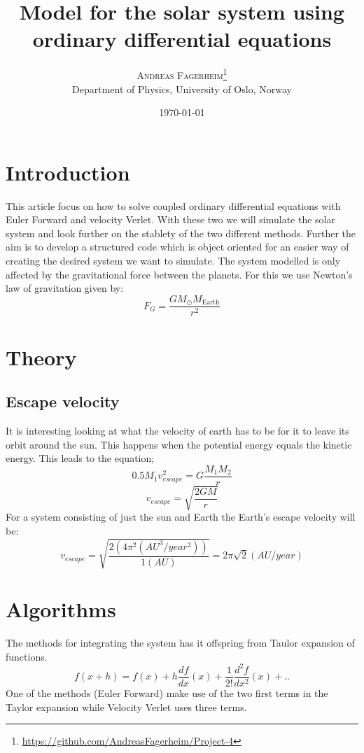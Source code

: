\documentclass[twoside,twocolumn]{article}
\title{Model for the solar system using ordinary differential equations } %
\author{%
\textsc{Andreas Fagerheim}\thanks{\url{https://github.com/AndreasFagerheim/Project-4}} \\[1ex] %
\normalsize Department of Physics, University of Oslo, Norway \\ %
}
\date{\today} %
\begin{document}
\maketitle

\section{Introduction}
This article focus on how to solve coupled ordinary differential equations with Euler Forward and velocity Verlet. With these two we will simulate the solar system and look further on the stablety of the two different methods. Further the aim is to develop a structured code which is object oriented for an easier way of creating the desired system we want to simulate.
The system modelled is only affected by the gravitational force between the planets. For this we use Newton's law of gravitation given by:
\begin{equation}
F_G=\frac{GM_{\odot}M_{\mathrm{Earth}}}{r^2}
\end{equation}
\section{Theory}

\subsection{Escape velocity}
It is interesting looking at what the velocity of earth has to be for it to leave its orbit around the sun. This happens when the potential energy equals the kinetic energy. This leads to the equation;
\begin{equation}
0.5M_1v_{escape}^2 = G\frac{M_1M_2}{r}
\end{equation}
\begin{equation}
v_{escape}= \sqrt{\frac{2GM}{r}} 
\end{equation}
For a system consisting of just the sun and Earth the Earth's escape velocity will be:
\begin{equation}
v_{escape}= \sqrt{\frac{2(4\pi^2 (AU^3/year^2))}{1 (AU)}} = 2\pi \sqrt{2} (AU/year)
\end{equation}
\section{Algorithms}
The methods for integrating the system has it offspring from Taulor expansion of functions. 
\[
f(x+h) = f(x) +h\frac{df}{dx}(x)+\frac{1}{2!}\frac{d^2f}{dx^2}(x) +..
\]
One of the methods (Euler Forward) make use of the two first terms in the Taylor expansion while Velocity Verlet uses three terms. 
\end{document}
